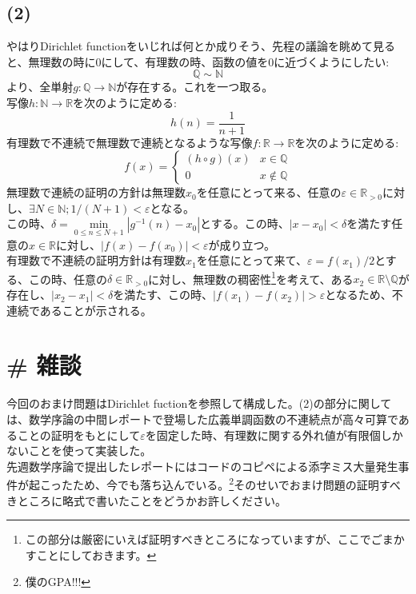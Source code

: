 \documentclass{jarticle}
\begin{document}
\subsection{(2)}
やはりDirichlet functionをいじれば何とか成りそう、先程の議論を眺めて見ると、無理数の時に0にして、有理数の時、函数の値を0に近づくようにしたい:
$$\mathbb{Q} \sim \mathbb{N}$$
より、全単射$g: \mathbb{Q} \to \mathbb{N}$が存在する。これを一つ取る。\\
写像$h : \mathbb{N} \to \mathbb{R}$を次のように定める:\\
$$ h(n) = \frac{1}{n+1} $$
有理数で不連続で無理数で連続となるような写像$f: \mathbb{R} \to \mathbb{R}$を次のように定める:
\begin{equation}
	f(x)=
	\begin{cases}
		(h\circ g)(x) &x \in \mathbb{Q}\\
		0& x\notin \mathbb{Q}
	\end{cases}
\end{equation}
無理数で連続の証明の方針は無理数$x_0$を任意にとって来る、任意の$\varepsilon \in \mathbb{R}_{>0}$に対し、$\exists N \in \mathbb{N}; 1/(N+1) < \varepsilon $となる。\\
この時、$\delta = \min\limits_{0 \le n \le N+1} |g^{-1}(n) - x_0|$とする。この時、$|x-x_0|<\delta $を満たす任意の$x \in \mathbb{R}$に対し、$|f(x)-f(x_0)| < \varepsilon$が成り立つ。\\
有理数で不連続の証明方針は有理数$x_1$を任意にとって来て、$\varepsilon =f(x_1)/2$とする、この時、任意の$\delta \in \mathbb{R}_{>0}$に対し、無理数の稠密性\footnote{この部分は厳密にいえば証明すべきところになっていますが、ここでごまかすことにしておきます。}を考えて、ある$x_2 \in \mathbb{R}\setminus \mathbb{Q} $が存在し、$|x_2 -x_1|< \delta$を満たす、この時、$|f(x_1) -f(x_2)|>\varepsilon$となるため、不連続であることが示される。\\
\newpage
\section{\# 雑談}
今回のおまけ問題はDirichlet fuctionを参照して構成した。(2)の部分に関しては、数学序論の中間レポートで登場した広義単調函数の不連続点が高々可算であることの証明をもとにして$\varepsilon$を固定した時、有理数に関する外れ値が有限個しかないことを使って実装した。\\
先週数学序論で提出したレポートにはコードのコピペによる添字ミス大量発生事件が起こったため、今でも落ち込んでいる。\footnote{僕のGPA!!!}そのせいでおまけ問題の証明すべきところに略式で書いたことをどうかお許しください。
\end{document}
